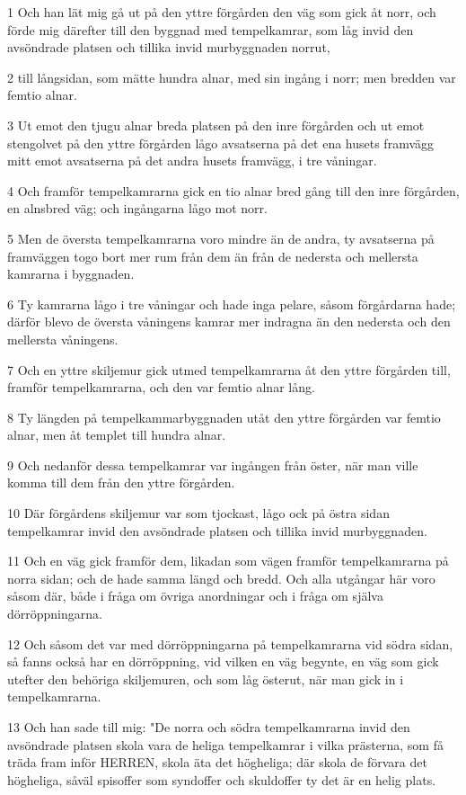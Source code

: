 \par 1 Och han lät mig gå ut på den yttre förgården den väg som gick åt norr, och förde mig därefter till den byggnad med tempelkamrar, som låg invid den avsöndrade platsen och tillika invid murbyggnaden norrut,
\par 2 till långsidan, som mätte hundra alnar, med sin ingång i norr; men bredden var femtio alnar.
\par 3 Ut emot den tjugu alnar breda platsen på den inre förgården och ut emot stengolvet på den yttre förgården lågo avsatserna på det ena husets framvägg mitt emot avsatserna på det andra husets framvägg, i tre våningar.
\par 4 Och framför tempelkamrarna gick en tio alnar bred gång till den inre förgården, en alnsbred väg; och ingångarna lågo mot norr.
\par 5 Men de översta tempelkamrarna voro mindre än de andra, ty avsatserna på framväggen togo bort mer rum från dem än från de nedersta och mellersta kamrarna i byggnaden.
\par 6 Ty kamrarna lågo i tre våningar och hade inga pelare, såsom förgårdarna hade; därför blevo de översta våningens kamrar mer indragna än den nedersta och den mellersta våningens.
\par 7 Och en yttre skiljemur gick utmed tempelkamrarna åt den yttre förgården till, framför tempelkamrarna, och den var femtio alnar lång.
\par 8 Ty längden på tempelkammarbyggnaden utåt den yttre förgården var femtio alnar, men åt templet till hundra alnar.
\par 9 Och nedanför dessa tempelkamrar var ingången från öster, när man ville komma till dem från den yttre förgården.
\par 10 Där förgårdens skiljemur var som tjockast, lågo ock på östra sidan tempelkamrar invid den avsöndrade platsen och tillika invid murbyggnaden.
\par 11 Och en väg gick framför dem, likadan som vägen framför tempelkamrarna på norra sidan; och de hade samma längd och bredd. Och alla utgångar här voro såsom där, både i fråga om övriga anordningar och i fråga om själva dörröppningarna.
\par 12 Och såsom det var med dörröppningarna på tempelkamrarna vid södra sidan, så fanns också har en dörröppning, vid vilken en väg begynte, en väg som gick utefter den behöriga skiljemuren, och som låg österut, när man gick in i tempelkamrarna.
\par 13 Och han sade till mig: "De norra och södra tempelkamrarna invid den avsöndrade platsen skola vara de heliga tempelkamrar i vilka prästerna, som få träda fram inför HERREN, skola äta det högheliga; där skola de förvara det högheliga, såväl spisoffer som syndoffer och skuldoffer ty det är en helig plats.
